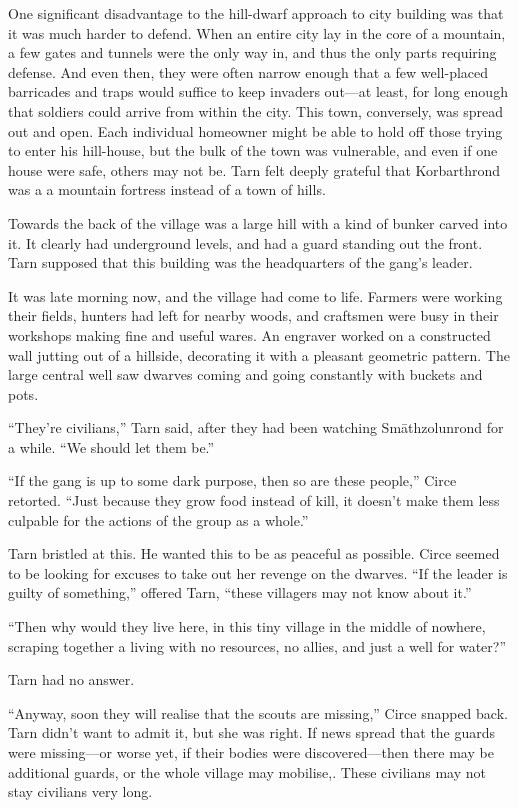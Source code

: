 One significant disadvantage to the hill-dwarf approach to city building was that it was much harder to defend.  When an entire city lay in the core of a mountain, a few gates and tunnels were the only way in, and thus the only parts requiring defense.  And even then, they were often narrow enough that a few well-placed barricades and traps would suffice to keep invaders out---at least, for long enough that soldiers could arrive from within the city.  This town, conversely, was spread out and open.  Each individual homeowner might be able to hold off those trying to enter his hill-house, but the bulk of the town was vulnerable, and even if one house were safe, others may not be.  Tarn felt deeply grateful that Korbarthrond was a a mountain fortress instead of a town of hills.

Towards the back of the village was a large hill with a kind of bunker carved into it.  It clearly had underground levels, and had a guard standing out the front.  Tarn supposed that this building was the headquarters of the gang's leader.

It was late morning now, and the village had come to life.  Farmers were working their fields, hunters had left for nearby woods, and craftsmen were busy in their workshops making fine and useful wares.  An engraver worked on a constructed wall jutting out of a hillside, decorating it with a pleasant geometric pattern.  The large central well saw dwarves coming and going constantly with buckets and pots.

``They're civilians,'' Tarn said, after they had been watching Sm\=athzolunrond for a while.  ``We should let them be.''

``If the gang is up to some dark purpose, then so are these people,'' Circe retorted.  ``Just because they grow food instead of kill, it doesn't make them less culpable for the actions of the group as a whole.''

Tarn bristled at this.  He wanted this to be as peaceful as possible.  Circe seemed to be looking for excuses to take out her revenge on the dwarves.  ``If the leader is guilty of something,'' offered Tarn, ``these villagers may not know about it.''

``Then why would they live here, in this tiny village in the middle of nowhere, scraping together a living with no resources, no allies, and just a well for water?''

Tarn had no answer.

``Anyway, soon they will realise that the scouts are missing,'' Circe snapped back.  Tarn didn't want to admit it, but she was right.  If news spread that the guards were missing---or worse yet, if their bodies were discovered---then there may be additional guards, or the whole village may mobilise,.  These civilians may not stay civilians very long.

